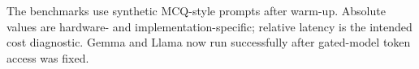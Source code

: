 \begin{table}[t]
\begin{threeparttable}
\begin{tablenotes}[flushleft]\footnotesize\item \parbox{0.95\textwidth}{The benchmarks use synthetic MCQ-style prompts after warm-up. Absolute values are hardware- and implementation-specific; relative latency is the intended cost diagnostic. Gemma and Llama now run successfully after gated-model token access was fixed.}\end{tablenotes}
\end{threeparttable}
\end{table}
